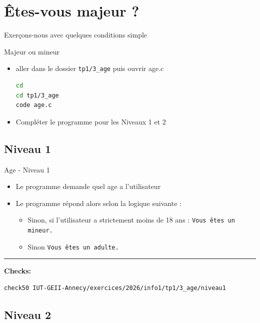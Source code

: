 
\section{Êtes-vous majeur ?}
Exerçons-nous avec quelques conditions simple

\begin{UPSTIManipulation}{Majeur ou mineur}
	\begin{itemize}
		\item[$\Box$] aller dans le dossier \texttt{tp1/3\_age} puis ouvrir age.c
		      \begin{lstlisting}[language=bash,style=console]
cd
cd tp1/3_age
code age.c
\end{lstlisting}
		\item[$\Box$] Compléter le programme pour les Niveaux 1 et 2
	\end{itemize}
\end{UPSTIManipulation}

\subsection{Niveau 1}

\begin{UPSTIcahierDesCharges}{Age - Niveau 1}
	\begin{itemize}
		\item[$\Box$] Le programme demande quel age a l'utilisateur
		\item[$\Box$] Le programme répond alors selon la logique suivante :
		      \begin{itemize}
			      \item[$\Box$] Sinon, si l'utilisateur a strictement moins de 18 ans : \texttt{Vous êtes un mineur.}
			      \item[$\Box$] Sinon \texttt{Vous êtes un adulte.}
		      \end{itemize}
	\end{itemize}
	\hrule
	\textbf{Checks:}
	\begin{lstlisting}[language=bash,style=console]
check50 IUT-GEII-Annecy/exercices/2026/info1/tp1/3_age/niveau1
\end{lstlisting}
\end{UPSTIcahierDesCharges}

\subsection{Niveau 2}

